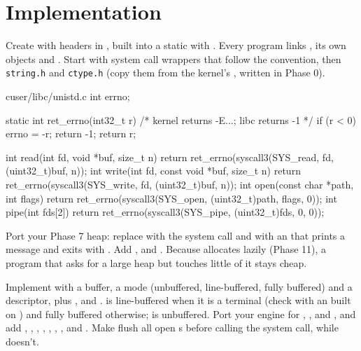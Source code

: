 \documentclass[11pt,a4paper]{article}
\begin{document}
\section{Implementation}

Create  with headers in , built into a static  with
. Every program links , its own objects and . Start with system call
wrappers that follow the  convention, then \texttt{string.h} and \texttt{ctype.h} (copy them from the
kernel's , written in Phase 0).

\begin{lst}{c}{user/libc/unistd.c}
int errno;

static int ret_errno(int32_t r)             /* kernel returns -E...; libc returns -1 */
{
    if (r < 0) {
        errno = -r;
        return -1;
    }
    return r;
}

int read(int fd, void *buf, size_t n)  { return ret_errno(syscall3(SYS_read,  fd, (uint32_t)buf, n)); }
int write(int fd, const void *buf, size_t n) { return ret_errno(syscall3(SYS_write, fd, (uint32_t)buf, n)); }
int open(const char *path, int flags)  { return ret_errno(syscall3(SYS_open, (uint32_t)path, flags, 0)); }
int pipe(int fds[2])                   { return ret_errno(syscall3(SYS_pipe, (uint32_t)fds, 0, 0)); }
\end{lst}

Port your Phase 7 heap: replace  with the  system call and  with an
 that prints a message and exits with . Add ,  and .
Because  allocates lazily (Phase 11), a program that asks for a large heap but touches little of it stays
cheap.

Implement  with a buffer, a mode (unbuffered, line-buffered, fully buffered) and a descriptor, plus
,  and .  is line-buffered when it is a terminal (check with an
 built on ) and fully buffered otherwise;  is unbuffered. Port your 
engine for , ,  and , and add , ,
, , , , ,  and . Make
 flush all open s before calling the system call, while  doesn't.
\end{document}
